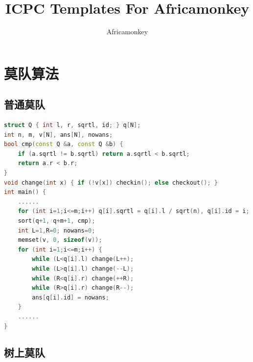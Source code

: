 \documentclass{article}
\begin{document}
\title{ICPC Templates For Africamonkey}
\author {Africamonkey}
\maketitle
\tableofcontents
\newpage
\section{莫队算法}
\subsection{普通莫队}
\begin{lstlisting}[language=C++]
struct Q { int l, r, sqrtl, id; } q[N];
int n, m, v[N], ans[N], nowans;
bool cmp(const Q &a, const Q &b) {
	if (a.sqrtl != b.sqrtl) return a.sqrtl < b.sqrtl;
	return a.r < b.r;
}
void change(int x) { if (!v[x]) checkin(); else checkout(); }
int main() {
	......
	for (int i=1;i<=m;i++) q[i].sqrtl = q[i].l / sqrt(n), q[i].id = i;
	sort(q+1, q+m+1, cmp);
	int L=1,R=0; nowans=0;
	memset(v, 0, sizeof(v));
	for (int i=1;i<=m;i++) {
		while (L<q[i].l) change(L++);
		while (L>q[i].l) change(--L);
		while (R<q[i].r) change(++R);
		while (R>q[i].r) change(R--);
		ans[q[i].id] = nowans;
	}
	......
}
\end{lstlisting}
\subsection{树上莫队}
\end{document}
